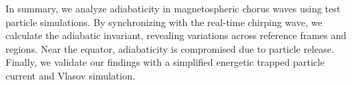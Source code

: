 In summary, we analyze adiabaticity in magnetospheric chorus waves using test particle simulations. By synchronizing with the real-time chirping wave, we calculate the adiabatic invariant, revealing variations across reference frames and regions. Near the equator, adiabaticity is compromised due to particle release. Finally, we validate our findings with a simplified energetic trapped particle current and Vlasov simulation.